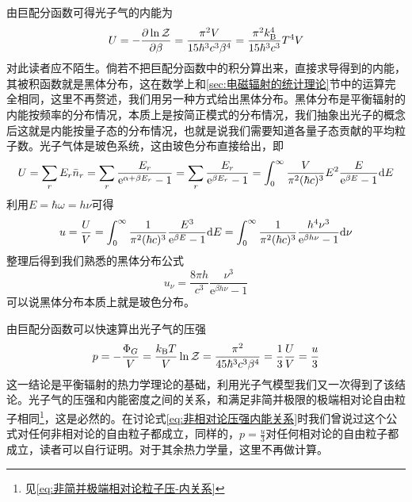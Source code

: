 \documentclass[../../main.tex]{subfiles}
\begin{document}
由巨配分函数可得光子气的内能为
\begin{equation}
    U=-\pdv{\ln\mathcal{Z}}{\beta}=\frac{\pi^2V}{15\hbar^3c^3\beta^4}=\frac{\pi^2k_{\mathrm{B}}^4}{15\hbar^3c^3}T^4V
\end{equation}
对此读者应不陌生。倘若不把巨配分函数中的积分算出来，直接求导得到的内能，其被积函数就是黑体分布，这在数学上和\ref{sec:电磁辐射的统计理论}节中的运算完全相同，这里不再赘述，我们用另一种方式给出黑体分布。黑体分布是平衡辐射的内能按频率的分布情况，本质上是按简正模式的分布情况，我们抽象出光子的概念后这就是内能按量子态的分布情况，也就是说我们需要知道各量子态贡献的平均粒子数。光子气体是玻色系统，这由玻色分布直接给出，即
\begin{equation}
    U=\sum_r E_r\bar{n}_r=\sum_r \frac{E_r}{\mathrm{e}^{\alpha+\beta E_r}-1}=\sum_r \frac{E_r}{\mathrm{e}^{\beta E_r}-1}=\int_0^\infty\frac{V}{\pi^2(\hbar c)^3}E^2\frac{E}{\mathrm{e}^{\beta E}-1}\dd E
\end{equation}
利用\(E=\hbar\omega=h\nu\)可得
\begin{equation}
    u=\frac{U}{V}=\int_0^{\infty}\frac{1}{\pi^2(\hbar c)^3}\frac{E^3}{\mathrm{e}^{\beta E}-1}\dd E=\int_0^{\infty}\frac{1}{\pi^2(\hbar c)^3}\frac{h^4\nu^3}{\mathrm{e}^{\beta h \nu}-1}\dd \nu
\end{equation}
整理后得到我们熟悉的黑体分布公式
\begin{equation}
    u_{\nu}=\frac{8\pi h}{c^3}\frac{\nu^3}{\mathrm{e}^{\beta h\nu}-1}
\end{equation}
可以说黑体分布本质上就是玻色分布。

由巨配分函数可以快速算出光子气的压强
\begin{equation}
    p=-\frac{\Phi_{G}}{V}=\frac{k_{\mathrm{B}} T}{V}\ln\mathcal{Z}=\frac{\pi^2}{45\hbar^3c^3\beta^4}=\frac{1}{3}\frac{U}{V}=\frac{u}{3}
\end{equation}
这一结论是平衡辐射的热力学理论的基础，利用光子气模型我们又一次得到了该结论。光子气的压强和内能密度之间的关系，和满足非简并极限的极端相对论自由粒子相同\footnote{见\eqref{eq:非简并极端相对论粒子压-内关系}}，这是必然的。在讨论式\eqref{eq:非相对论压强内能关系}时我们曾说过这个公式对任何非相对论的自由粒子都成立，同样的，\(p=\frac{u}{3}\)对任何相对论的自由粒子都成立，读者可以自行证明。对于其余热力学量，这里不再做计算。
\end{document}
